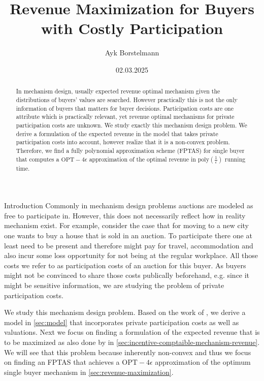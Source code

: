 \documentclass[11pt,a4paper]{article}
\author{Ayk Borstelmann}
\title{Revenue Maximization for Buyers with Costly Participation}
\date{02.03.2025}
\newcommand{\1}[1]{\mbox{\rm\bf 1}_{#1}}
\begin{document}
\maketitle

\begin{abstract}
    In mechanism design, usually expected revenue optimal mechanism given the distributions of buyers' values are searched.
    However practically this is not the only information of buyers that matters for buyer decisions.
    Participation costs are one attribute which is practically relevant, yet revenue optimal mechanisms for private participation costs are unknown.
    We study exactly this mechanism design problem.
    We derive a formulation of the expected revenue in the model that takes private participation costs into account, however realize that it is a non-convex problem.
    Therefore, we find a fully polynomial approximation scheme (FPTAS) for single buyer that computes a $\mathrm{OPT} - 4\epsilon$ approximation of the optimal revenue in $\mathrm{poly}\left(\frac{1}{\epsilon}\right)$ running time.
\end{abstract}

\begin{section}{Introduction}
 Commonly in mechanism design problems auctions are modeled as free to participate in.
 However, this does not necessarily reflect how in reality mechanism exist.
 For example, consider the case that for moving to a new city one wants to buy a house that is sold in an auction.
 To participate there one at least need to be present and therefore might pay for travel, accommodation and also incur some loss opportunity for not being at the regular workplace.
 All those costs we refer to as participation costs of an auction for this buyer.
 As buyers might not be convinced to share those costs publically beforehand, e.g. since it might be sensitive information, we are studying the problem of private participation costs.

 We study this mechanism design problem.
 Based on the work of \citet{primary}, we derive a model in \autoref{sec:model} that incorporates private participation costs as well as valuations.
 Next we focus on finding a formulation of the expected revenue that is to be maximized as also done by \citet{myerson} in \autoref{sec:incentive-comptaible-mechanism-revenue}.
 We will see that this problem because inherently non-convex and thus we focus on finding an FPTAS that achieves a $\mathrm{OPT} - 4\epsilon$ approximation of the optimum single buyer mechanism in \autoref{sec:revenue-maximization}.
\end{section}
\end{document}
